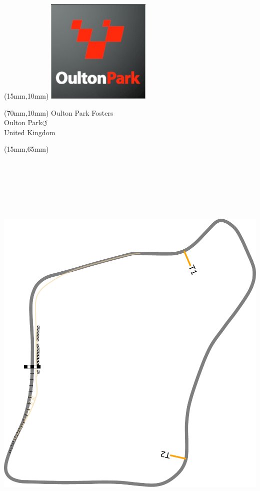 \null\newpage
\begin{textblock*}{50mm}(15mm,10mm)%
\includegraphics[width=50mm]{LG/2015-05-20_00091.png}
\end{textblock*}
\begin{textblock*}{130mm}(70mm,10mm)%
{\fontsize{20}{20}\selectfont Oulton Park Fosters\\}
{\fontsize{16}{16}\selectfont Oulton Park\hfill \huge$\circlearrowleft$\\}
{\fontsize{12}{12}\selectfont United Kingdom\\}
\end{textblock*}
\begin{textblock*}{185mm}(15mm,65mm)%
\centering
\mbox{\includegraphics[width=185mm,height=210mm,keepaspectratio]{PT/OUPAFO.pdf}}
\end{textblock*}

